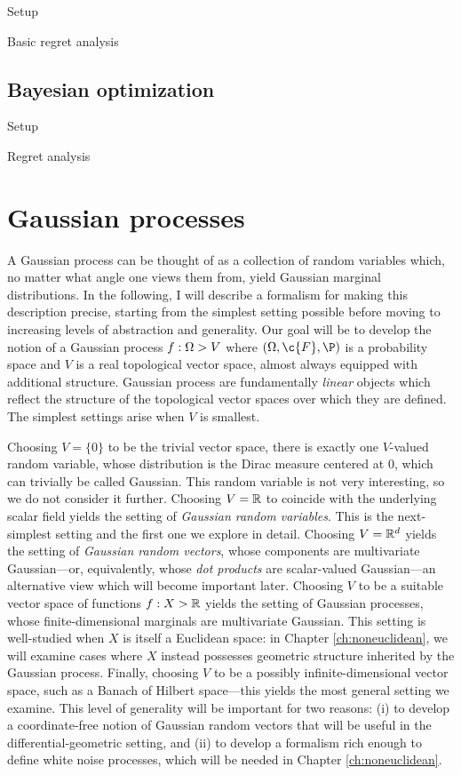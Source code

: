 \documentclass[11pt]{book}
\begin{document}
Setup

Basic regret analysis

\subsection{Bayesian optimization}

Setup

Regret analysis

\section{Gaussian processes}

A Gaussian process can be thought of as a collection of random variables which, no matter what angle one views them from, yield Gaussian marginal distributions.
In the following, I will describe a formalism for making this description precise, starting from the simplest setting possible before moving to increasing levels of abstraction and generality.
Our goal will be to develop the notion of a Gaussian process $f : \Omega \-> V$ where $(\Omega,\c{F},\P)$ is a probability space and $V$ is a real topological vector space, almost always equipped with additional structure.
Gaussian process are fundamentally \emph{linear} objects which reflect the structure of the topological vector spaces over which they are defined.
The simplest settings arise when $V$ is smallest.

\1  Choosing $V = \{0\}$ to be the trivial vector space, there is exactly one $V$-valued random variable, whose distribution is the Dirac measure centered at $0$, which can trivially be called Gaussian.
This random variable is not very interesting, so we do not consider it further.
\2 Choosing $V = \mathbb{R}$ to coincide with the underlying scalar field yields the setting of \emph{Gaussian random variables}.
This is the next-simplest setting and the first one we explore in detail.
\3 Choosing $V = \mathbb{R}^d$ yields the setting of \emph{Gaussian random vectors}, whose components are multivariate Gaussian---or, equivalently, whose \emph{dot products} are scalar-valued Gaussian---an alternative view which will become important later.
\4 Choosing $V$ to be a suitable vector space of functions $f : X \-> \mathbb{R}$ yields the setting of Gaussian processes, whose finite-dimensional marginals are multivariate Gaussian.
This setting is well-studied when $X$ is itself a Euclidean space: in Chapter \ref{ch:noneuclidean}, we will examine cases where $X$ instead possesses geometric structure inherited by the Gaussian process.
\5 Finally, choosing $V$ to be a possibly infinite-dimensional vector space, such as a Banach of Hilbert space---this yields the most general setting we examine.
This level of generality will be important for two reasons: (i) to develop a coordinate-free notion of Gaussian random vectors that will be useful in the differential-geometric setting, and (ii) to develop a formalism rich enough to define white noise processes, which will be needed in Chapter \ref{ch:noneuclidean}.
\0 
\end{document}
